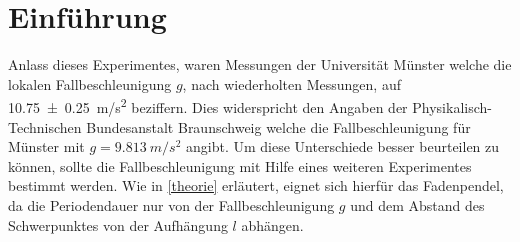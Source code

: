 \section{Einführung}
Anlass dieses Experimentes, waren Messungen der Universität Münster welche die lokalen Fallbeschleunigung $g$, nach wiederholten Messungen, auf \SI{10,75+-0,25}{m/s^2} beziffern. Dies widerspricht den Angaben der Physikalisch-Technischen Bundesanstalt Braunschweig welche die Fallbeschleunigung für Münster mit $g=\SI{9,813}{m/s^2}$ angibt. Um diese Unterschiede besser beurteilen zu können, sollte die Fallbeschleunigung mit Hilfe eines weiteren Experimentes bestimmt werden. Wie in \cref{theorie} erläutert, eignet sich hierfür das Fadenpendel, da die Periodendauer nur von der Fallbeschleunigung $g$ und dem Abstand des Schwerpunktes von der Aufhängung $l$ abhängen.